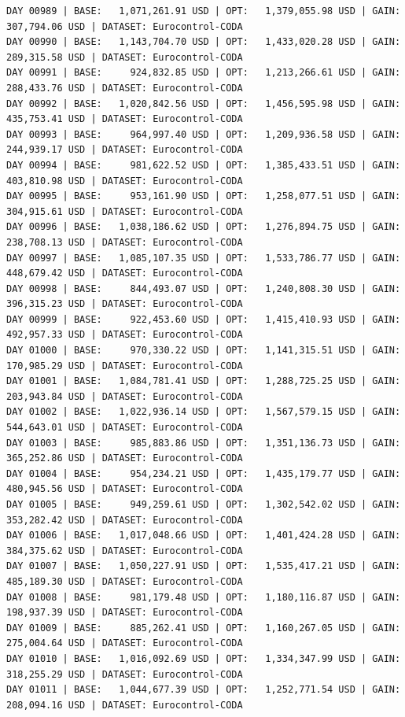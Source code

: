 \documentclass[11pt,a4paper]{article}
\begin{document}
\begin{verbatim}
DAY 00989 | BASE:   1,071,261.91 USD | OPT:   1,379,055.98 USD | GAIN: 307,794.06 USD | DATASET: Eurocontrol-CODA
DAY 00990 | BASE:   1,143,704.70 USD | OPT:   1,433,020.28 USD | GAIN: 289,315.58 USD | DATASET: Eurocontrol-CODA
DAY 00991 | BASE:     924,832.85 USD | OPT:   1,213,266.61 USD | GAIN: 288,433.76 USD | DATASET: Eurocontrol-CODA
DAY 00992 | BASE:   1,020,842.56 USD | OPT:   1,456,595.98 USD | GAIN: 435,753.41 USD | DATASET: Eurocontrol-CODA
DAY 00993 | BASE:     964,997.40 USD | OPT:   1,209,936.58 USD | GAIN: 244,939.17 USD | DATASET: Eurocontrol-CODA
DAY 00994 | BASE:     981,622.52 USD | OPT:   1,385,433.51 USD | GAIN: 403,810.98 USD | DATASET: Eurocontrol-CODA
DAY 00995 | BASE:     953,161.90 USD | OPT:   1,258,077.51 USD | GAIN: 304,915.61 USD | DATASET: Eurocontrol-CODA
DAY 00996 | BASE:   1,038,186.62 USD | OPT:   1,276,894.75 USD | GAIN: 238,708.13 USD | DATASET: Eurocontrol-CODA
DAY 00997 | BASE:   1,085,107.35 USD | OPT:   1,533,786.77 USD | GAIN: 448,679.42 USD | DATASET: Eurocontrol-CODA
DAY 00998 | BASE:     844,493.07 USD | OPT:   1,240,808.30 USD | GAIN: 396,315.23 USD | DATASET: Eurocontrol-CODA
DAY 00999 | BASE:     922,453.60 USD | OPT:   1,415,410.93 USD | GAIN: 492,957.33 USD | DATASET: Eurocontrol-CODA
DAY 01000 | BASE:     970,330.22 USD | OPT:   1,141,315.51 USD | GAIN: 170,985.29 USD | DATASET: Eurocontrol-CODA
DAY 01001 | BASE:   1,084,781.41 USD | OPT:   1,288,725.25 USD | GAIN: 203,943.84 USD | DATASET: Eurocontrol-CODA
DAY 01002 | BASE:   1,022,936.14 USD | OPT:   1,567,579.15 USD | GAIN: 544,643.01 USD | DATASET: Eurocontrol-CODA
DAY 01003 | BASE:     985,883.86 USD | OPT:   1,351,136.73 USD | GAIN: 365,252.86 USD | DATASET: Eurocontrol-CODA
DAY 01004 | BASE:     954,234.21 USD | OPT:   1,435,179.77 USD | GAIN: 480,945.56 USD | DATASET: Eurocontrol-CODA
DAY 01005 | BASE:     949,259.61 USD | OPT:   1,302,542.02 USD | GAIN: 353,282.42 USD | DATASET: Eurocontrol-CODA
DAY 01006 | BASE:   1,017,048.66 USD | OPT:   1,401,424.28 USD | GAIN: 384,375.62 USD | DATASET: Eurocontrol-CODA
DAY 01007 | BASE:   1,050,227.91 USD | OPT:   1,535,417.21 USD | GAIN: 485,189.30 USD | DATASET: Eurocontrol-CODA
DAY 01008 | BASE:     981,179.48 USD | OPT:   1,180,116.87 USD | GAIN: 198,937.39 USD | DATASET: Eurocontrol-CODA
DAY 01009 | BASE:     885,262.41 USD | OPT:   1,160,267.05 USD | GAIN: 275,004.64 USD | DATASET: Eurocontrol-CODA
DAY 01010 | BASE:   1,016,092.69 USD | OPT:   1,334,347.99 USD | GAIN: 318,255.29 USD | DATASET: Eurocontrol-CODA
DAY 01011 | BASE:   1,044,677.39 USD | OPT:   1,252,771.54 USD | GAIN: 208,094.16 USD | DATASET: Eurocontrol-CODA

\end{verbatim}
\end{document}
